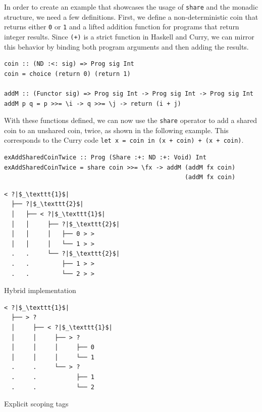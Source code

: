\documentclass[a4paper, 11pt, fleqn, twoside]{scrreprt}
\newcommand{\hinl}[1]{\texttt{#1}}
\begin{document}
In order to create an example that showcases the usage of \hinl{share} and the monadic structure, we need a few definitions.
First, we define a non-deterministic coin that returns either \hinl{0} or \hinl{1} and a lifted addition function for programs that return integer results.
Since \hinl{(+)} is a strict function in Haskell and Curry, we can mirror this behavior by binding both program arguments and then adding the results.

\begin{verbatim}
coin :: (ND :<: sig) => Prog sig Int
coin = choice (return 0) (return 1)

addM :: (Functor sig) => Prog sig Int -> Prog sig Int -> Prog sig Int
addM p q = p >>= \i -> q >>= \j -> return (i + j)
\end{verbatim}

With these functions defined, we can now use the \hinl{share} operator to add a shared coin to an unshared coin, twice, as shown in the following example.
This corresponds to the Curry code \hinl{let x = coin in (x + coin) + (x + coin)}.

\begin{verbatim}
exAddSharedCoinTwice :: Prog (Share :+: ND :+: Void) Int
exAddSharedCoinTwice = share coin >>= \fx -> addM (addM fx coin) 
                                                  (addM fx coin)
\end{verbatim}

\vspace{0.32cm}

\begin{minipage}{.4 \linewidth}
\begin{verbatim}
< ?|$_\texttt{1}$|
  ├── ?|$_\texttt{2}$|
  │   ├── < ?|$_\texttt{1}$|
  │   │     ├── ?|$_\texttt{2}$|
  │   │     │   ├── 0 > >
  │   │     │   └── 1 > >
  .   .     └── ?|$_\texttt{2}$|
  .   .         ├── 1 > >
  .   .         └── 2 > >
\end{verbatim}
\begin{center}
Hybrid implementation
\end{center}
\end{minipage}
\hspace{.1 \linewidth}
\vline
\hspace{.1 \linewidth}
\begin{minipage}{.475 \linewidth}
\begin{verbatim}
< ?|$_\texttt{1}$|
  ├── > ? 
  │     ├── < ?|$_\texttt{1}$|
  │     │     ├── > ? 
  │     │     │     ├── 0
  │     │     │     └── 1
  .     .     └── > ? 
  .     .           ├── 1
  .     .           └── 2
\end{verbatim}
\begin{center}
Explicit scoping tags
\end{center}
\end{minipage}
\end{document}

